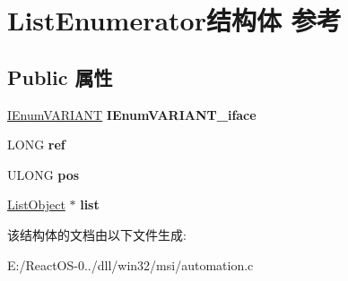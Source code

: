 \hypertarget{struct_list_enumerator}{}\section{List\+Enumerator结构体 参考}
\label{struct_list_enumerator}
\subsection*{Public 属性}
\begin{DoxyCompactItemize}
\item 
\mbox{\label{struct_list_enumerator_a5ab06a828c16b891befdef3041ac59fe}} 
\hyperlink{interface_i_enum_v_a_r_i_a_n_t}{I\+Enum\+V\+A\+R\+I\+A\+NT} {\bfseries I\+Enum\+V\+A\+R\+I\+A\+N\+T\+\_\+iface}
\item 
\mbox{\label{struct_list_enumerator_ad049edbef94ce0e8c81ddb9fa3d5f46b}} 
L\+O\+NG {\bfseries ref}
\item 
\mbox{\label{struct_list_enumerator_ad7d050b9189935611892305ad33c7c27}} 
U\+L\+O\+NG {\bfseries pos}
\item 
\mbox{\label{struct_list_enumerator_ac656d6a7757ac51d6008d34ca3d5bf9a}} 
\hyperlink{struct_list_object}{List\+Object} $\ast$ {\bfseries list}
\end{DoxyCompactItemize}


该结构体的文档由以下文件生成\+:\begin{DoxyCompactItemize}
\item 
E\+:/\+React\+O\+S-\/0../dll/win32/msi/automation.\+c\end{DoxyCompactItemize}
